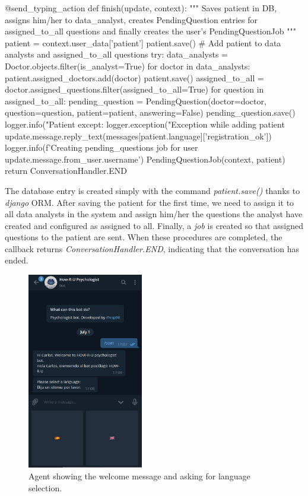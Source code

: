 \documentclass[12pt,english]{article}
\begin{document}
\begin{python}[caption={Patient saver callback}, captionpos=b]
  @send_typing_action
  def finish(update, context):
      """
      Saves patient in DB, assigns him/her to data_analyst, creates PendingQuestion entries for assigned_to_all questions and finally creates the user's PendingQuestionJob
      """
      patient = context.user_data['patient']
      patient.save()
      # Add patient to data analysts and assigned_to_all questions
      try:
          data_analysts = Doctor.objects.filter(is_analyst=True)
          for doctor in data_analysts:
              patient.assigned_doctors.add(doctor)
              patient.save()
              assigned_to_all = doctor.assigned_questions.filter(assigned_to_all=True)
              for question in assigned_to_all:
                  pending_question = PendingQuestion(doctor=doctor, question=question, patient=patient, answering=False)
                  pending_question.save()
          logger.info("Patient %
      except:
          logger.exception("Exception while adding patient %
      update.message.reply_text(messages[patient.language]['registration_ok'])
      logger.info(f'Creating pending_questions job for user {update.message.from_user.username}')
      PendingQuestionJob(context, patient)
      return ConversationHandler.END
\end{python}

The database entry is created simply with the command \emph{patient.save()} thanks to \emph{django} ORM. After saving the patient for the first time, we need to assign it to all data analysts in the system and assign him/her the questions the analyst have created and configured as assigned to all. Finally, a \emph{job} is created so that assigned questions to the patient are sent. When these procedures are completed, the callback returns \emph{ConversationHandler.END}, indicating that the conversation has ended.

\begin{figure}[H]
  \centering
  \includegraphics[width=0.45\textwidth]{start.png}
  \caption{Agent showing the welcome message and asking for language selection.}
\end{figure}
\end{document}
